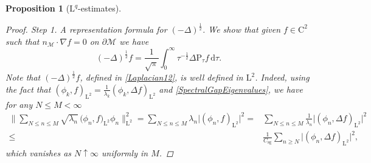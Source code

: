 \documentclass[11pt,a4paper,oneside]{amsart}
\numberwithin{equation}{section}
\newtheorem{proposition}[theorem]{Proposition}
\newcommand{\cc}{\text{C}}
\newcommand{\dd}{\mathrm{d}}
\newcommand{\LL}{\mathrm{L}}
\begin{document}
\begin{proposition}[$\LL^{q}$-estimates]
\begin{proof}
{\sc Step 1. A representation formula for $(-\Delta)^{\frac{1}{2}}$. }
%
We show that given $f\in \cc^2$ such that $n_{\mathcal{M}}\cdot \nabla f=0$ on $\partial \mathcal{M}$ we have
%
\begin{equation}\label{Eq45}
(-\Delta)^{\frac{1}{2}} f=\frac{1}{\sqrt{\pi}}\int_{0}^\infty\tau^{-\frac{1}{2}}\Delta \text{P}_{\tau}f\,\dd\tau.
\end{equation}
%
%
%
%
%
Note that $(-\Delta)^{\frac{1}{2}}f$, defined in \eqref{Laplacian12}, is well defined in $\LL^2$. Indeed, using the fact that $(\phi_k,f)_{\LL^2}=\frac{1}{\lambda_k}(\phi_k,\Delta f)_{\LL^2}$ and \eqref{SpectralGapEigenvalues}, we have for any $N\leq M<\infty$
%
\begin{align*}
%
\bigg\|\sum_{N\leq n\leq M}\sqrt{\lambda_n}\,\big(\phi_n,f)_{\LL^2}\phi_n\bigg\|^2_{\LL^2}=\sum_{N\leq n\leq M}\lambda_n\vert (\phi_n,f)_{\LL^2}\vert^2=&\sum_{N\leq n\leq M}\tfrac{1}{\lambda_n}\vert (\phi_n,\Delta f)_{\LL^2}\vert^2\\
\leq & \tfrac{1}{C_{\text{sg}}}\sum_{n\geq N}\vert (\phi_n,\Delta f)_{\LL^2}\vert^2,
%
\end{align*}
%
which vanishes as $N\uparrow\infty$ uniformly in $M$.

%
\medskip
%


\end{proof}
\end{proposition}
\end{document}
